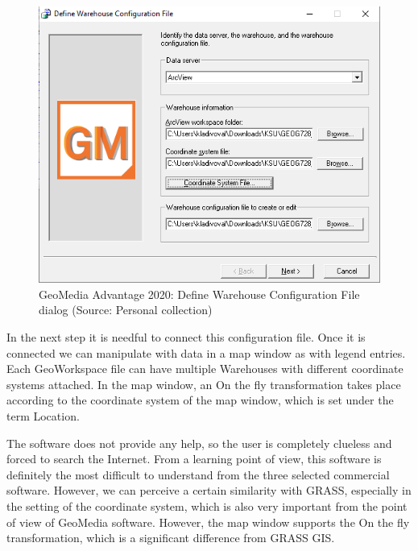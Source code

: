 \documentclass[a4paper,10pt,twoside]{article}
\begin{document}
\vspace{0.3cm}
\begin{figure}[hbt!] 
\begin{center}
\includegraphics[width=13cm]{../pictures/define_config_geomedia.png} 
\caption[GeoMedia Advantage 2020: Define Warehouse Configuration File dialog]{GeoMedia Advantage 2020: Define Warehouse Configuration File dialog (Source: Personal collection)}
\label{fig:define_config_geomedia}
\end{center}
\end{figure}

\noindent In the next step it is needful to connect this configuration file. Once it is connected we can manipulate with data in a map window as with legend entries. Each GeoWorkspace file can have multiple Warehouses with different coordinate systems attached. In the map window, an On the fly transformation takes place according to the coordinate system of the map window, which is set under the term Location.

The software does not provide any help, so the user is completely clueless and forced to search the Internet. From a learning point of view, this software is definitely the most difficult to understand from the three selected commercial software. However, we can perceive a certain similarity with GRASS, especially in the setting of the coordinate system, which is also very important from the point of view of GeoMedia software. However, the map window supports the On the fly transformation, which is a significant difference from GRASS GIS.
\end{document}
